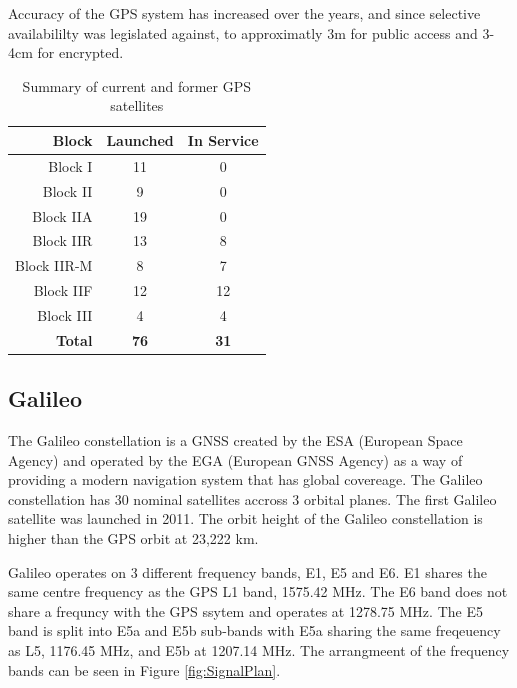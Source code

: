 Accuracy of the GPS system has increased over the years, and since selective availabililty was legislated against, to approximatly 3m for public access and 3-4cm for
encrypted.

\renewcommand{\arraystretch}{1.5}
\begin{table}
    \begin{center}
        \caption{Summary of current and former GPS satellites}
        \label{tab:GPSSatSum}
        \begin{tabular}{ |r|c|c| }
            \hline
            \textbf{Block} & \textbf{Launched} & \textbf{In Service} \\
            \hline
            Block I & 11 & 0\\
            \hline
            Block II & 9 & 0\\
            \hline
            Block IIA & 19 & 0\\
            \hline
            Block IIR & 13 & 8\\
            \hline
            Block IIR-M & 8 & 7\\
            \hline
            Block IIF & 12 & 12\\
            \hline
            Block III & 4 & 4\\
            \hline
            \hline
            \textbf{Total} & \textbf{76} & \textbf{31}\\
            \hline
        \end{tabular}
    \end{center}
\end{table}
\renewcommand{\arraystretch}{1}

\subsection{Galileo} \label{subsec:GNSS_GalileoIntro}
The Galileo constellation is a GNSS created by the ESA (European Space Agency) and operated by the EGA (European GNSS Agency) as a way of providing a modern navigation
system that has global covereage. The Galileo constellation has 30 nominal satellites accross 3 orbital planes. The first Galileo satellite was launched in 2011.
The orbit height of the Galileo constellation is higher than the GPS orbit at 23,222 km. 

Galileo operates on 3 different frequency bands, E1, E5 and E6. E1 shares the same centre frequency as the GPS L1 band, 1575.42 MHz. The E6 band does not share a frequncy
with the GPS ssytem and operates at 1278.75 MHz. The E5 band is split into E5a and E5b sub-bands with E5a sharing the same freqeuency as L5, 1176.45 MHz, and E5b at
1207.14 MHz. The arrangmeent of the frequency bands can be seen in Figure \ref{fig:SignalPlan}.

